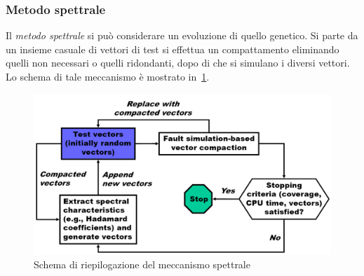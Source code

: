 \subsubsection{Metodo spettrale}
Il \emph{metodo spettrale} si può considerare un evoluzione di quello genetico. Si parte da un insieme casuale di vettori di test si effettua un compattamento eliminando quelli non necessari o quelli ridondanti, dopo di che si simulano i diversi vettori. Lo schema di tale meccanismo è mostrato in \figurename\,\ref{fig:spectralmet}.
\begin{figure}
\centering
\includegraphics[scale=0.4]{img/spectralmeth.png}
\caption{Schema di riepilogazione del meccanismo spettrale}\label{fig:spectralmet}
\end{figure}